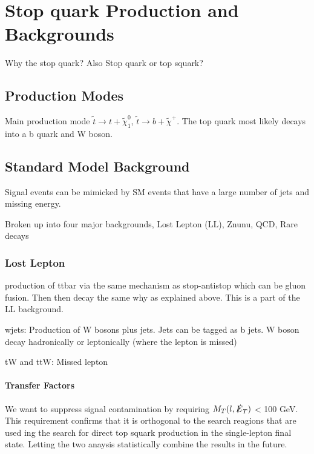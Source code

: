 \chapter{Stop quark Production and Backgrounds}
\label{ch:Search}

Why the stop quark? Also Stop quark or top squark?

\section{Production Modes}
\label{sec:Production}

Main production mode $\tilde{t}\rightarrow t+\tilde{\chi}^{0}_{1}$, $\tilde{t}\rightarrow b+\tilde{\chi}^{+}$. The top quark most likely decays into a b quark and W boson. 

\section{Standard Model Background}
\label{sec:SMBackground}

Signal events can be mimicked by SM events that have a large number of jets and missing energy. 

Broken up into four major backgrounds, Lost Lepton (LL), Znunu, QCD, Rare decays

\subsection{Lost Lepton}
\label{subsec:LL}

\ttbar{} production of ttbar via the same mechanism as stop-antistop which can be gluon fusion. Then then decay the same why as explained above. This is a part of the LL background. 

wjets: Production of W bosons plus jets. Jets can be tagged as b jets. W boson decay hadronically or leptonically (where the lepton is missed)

tW and ttW: Missed lepton

\subsubsection{Transfer Factors}
\label{subsec:TF}

We want to suppress signal contamination by requiring $M_{T}(l, \slashed{E}_{T})$ < 100 GeV. This requirement confirms that it is orthogonal to the search reagions that are used ing the search for direct top squark production in the single-lepton final state. Letting the two anaysis statistically combine the results in the future. 

